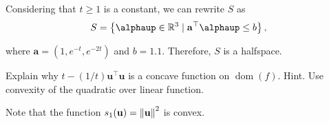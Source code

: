 \documentclass[12pt,a4paper]{article}
\newcommand{\dom}[1]{\ensuremath{\operatorname{dom}\left(#1\right)}} %
\begin{document}
Considering that \(t \geq 1\) is a constant, we can rewrite \(S\) as
\begin{align}
    S = \left\{ \boldsymbol{\alphaup} \in \mathbb{R}^3 \mid \mathbf{a}^\top \boldsymbol{\alphaup} \leq b \right\},
\end{align}

where \(\mathbf{a} = (1, e^{-t}, e^{-2t})\) and \(b=1.1\). Therefore, \(S\) is a halfspace.

\problem

\subproblem Explain why \(t-(1/t)\mathbf{u}^\top \mathbf{u}\) is a concave function on \(\dom{f}\). Hint. Use convexity of the quadratic
over linear function.

Note that the function \(s_1(\mathbf{u}) = \norm{\mathbf{u}}^2\) is convex.
\end{document}
